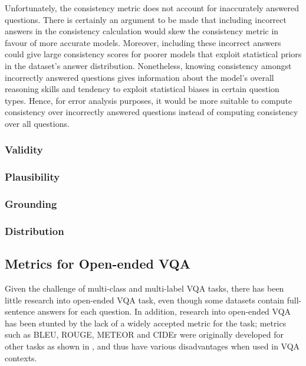 
Unfortunately, the consistency metric does not account for inaccurately answered questions. There is certainly an argument to be made that including incorrect answers in the consistency calculation would skew the consistency metric in favour of more accurate models. Moreover, including these incorrect answers could give large consistency scores for poorer models that exploit statistical priors in the dataset's answer distribution.
Nonetheless, knowing consistency amongst incorrectly answered questions gives information about the model's overall reasoning skills and tendency to exploit statistical biases in certain question types. Hence, for error analysis purposes, it would be more suitable to compute consistency over incorrectly answered questions instead of computing consistency over all questions.


\subsubsection{Validity}
\subsubsection{Plausibility}
\subsubsection{Grounding}
\subsubsection{Distribution}

\subsection{Metrics for Open-ended VQA}
\label{subsection:open_ended_vqa_metrics}

Given the challenge of multi-class and multi-label VQA tasks, there has been little research into open-ended VQA task, even though some datasets contain full-sentence answers for each question. In addition, research into open-ended VQA has been stunted by the lack of a widely accepted metric for the task; metrics such as BLEU,  ROUGE, METEOR and CIDEr were originally developed for other tasks as shown in \tableautorefname{ \ref{tab:vqa_metrics_comparison}}, and thus have various disadvantages when used in VQA contexts.

